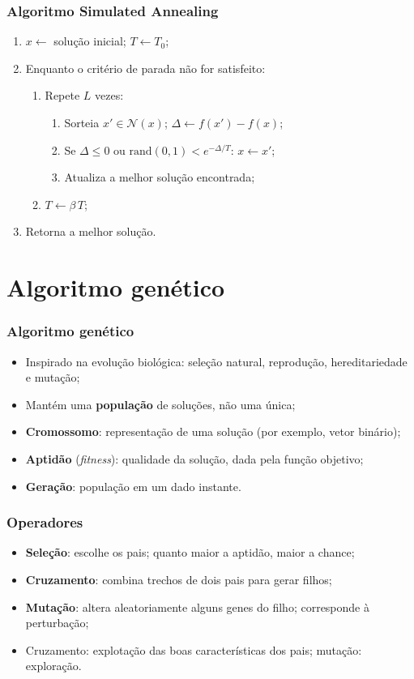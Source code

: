 \documentclass[fleqn]{beamer}
\begin{document}
\begin{frame}
	\frametitle{Algoritmo Simulated Annealing}
	\begin{enumerate}
		\item $x \leftarrow$ solução inicial; $T \leftarrow T_0$;
		\item Enquanto o critério de parada não for satisfeito:
		\begin{enumerate}
			\item Repete $L$ vezes:
			\begin{enumerate}
				\item Sorteia $x' \in \mathcal{N}(x)$; $\Delta \leftarrow f(x') - f(x)$;
				\item Se $\Delta \leq 0$ ou $\text{rand}(0,1) < e^{-\Delta/T}$: $x \leftarrow x'$;
				\item Atualiza a melhor solução encontrada;
			\end{enumerate}
			\item $T \leftarrow \beta\,T$;
		\end{enumerate}
		\item Retorna a melhor solução.
	\end{enumerate}
\end{frame}

\section{Algoritmo genético}

\begin{frame}
	\frametitle{Algoritmo genético}
	\begin{itemize}
		\item Inspirado na evolução biológica: seleção natural,
			reprodução, hereditariedade e mutação;
		\item Mantém uma \textbf{população} de soluções, não uma única;
		\item \textbf{Cromossomo}: representação de uma solução (por
			exemplo, vetor binário);
		\item \textbf{Aptidão} (\textit{fitness}): qualidade da solução,
			dada pela função objetivo;
		\item \textbf{Geração}: população em um dado instante.
	\end{itemize}
\end{frame}

\begin{frame}
	\frametitle{Operadores}
	\begin{itemize}
		\item \textbf{Seleção}: escolhe os pais; quanto maior a aptidão,
			maior a chance;
		\item \textbf{Cruzamento}: combina trechos de dois pais para
			gerar filhos;
		\item \textbf{Mutação}: altera aleatoriamente alguns genes do
			filho; corresponde à perturbação;
		\item Cruzamento: explotação das boas características dos pais;
			mutação: exploração.
	\end{itemize}
\end{frame}
\end{document}
